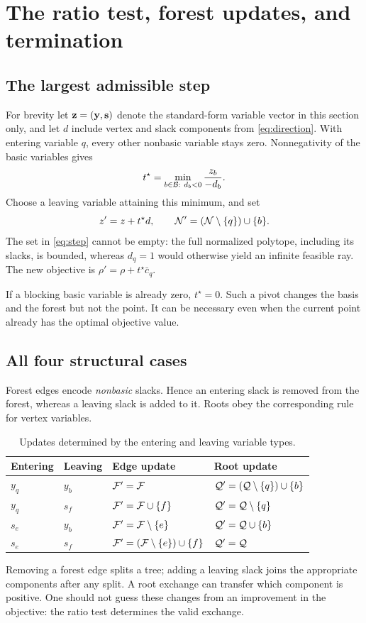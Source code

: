 \section{The ratio test, forest updates, and termination}\label{sec:pivots}

\subsection{The largest admissible step}
For brevity let $\mathbf{z}=(\mathbf{y},\mathbf{s})$ denote the standard-form variable vector in this
section only, and let $d$ include vertex and slack components from
\eqref{eq:direction}. With entering variable $q$, every other nonbasic
variable stays zero. Nonnegativity of the basic variables gives
\begin{equation}\label{eq:step}
 t^\star=\min_{b\in\mathcal B:\ d_b<0}\frac{z_b}{-d_b}.
\end{equation}
Choose a leaving variable attaining this minimum, and set
\begin{equation}\label{eq:pivot}
 z'=z+t^\star d,\qquad
 \mathcal N'=(\mathcal N\setminus\{q\})\cup\{b\}.
\end{equation}
The set in \eqref{eq:step} cannot be empty: the full normalized polytope,
including its slacks, is bounded, whereas $d_q=1$ would otherwise yield
an infinite feasible ray. The new objective is
$\rho'=\rho+t^\star\bar c_q$.

If a blocking basic variable is already zero, $t^\star=0$. Such a pivot
changes the basis and the forest but not the point. It can be necessary
even when the current point already has the optimal objective value.

\subsection{All four structural cases}
Forest edges encode \emph{nonbasic} slacks. Hence an entering slack is
removed from the forest, whereas a leaving slack is added to it. Roots
obey the corresponding rule for vertex variables.
\begin{table}[htbp]
\centering\small
\begin{tabular}{llll}
\toprule
Entering & Leaving & Edge update & Root update\\
\midrule
$y_q$ & $y_b$ & $\mathcal F' =\mathcal F$ & $\mathcal Q'=(\mathcal Q\setminus\{q\})\cup\{b\}$\\
$y_q$ & $s_f$ & $\mathcal F'=\mathcal F\cup\{f\}$ & $\mathcal Q'=\mathcal Q\setminus\{q\}$\\
$s_e$ & $y_b$ & $\mathcal F'=\mathcal F\setminus\{e\}$ & $\mathcal Q'=\mathcal Q\cup\{b\}$\\
$s_e$ & $s_f$ & $\mathcal F'=(\mathcal F\setminus\{e\})\cup\{f\}$ & $\mathcal Q'=\mathcal Q$\\
\bottomrule
\end{tabular}
\caption{Updates determined by the entering and leaving variable types.}
\label{tab:updates}
\end{table}
Removing a forest edge splits a tree; adding a leaving slack joins the
appropriate components after any split. A root exchange can transfer
which component is positive. One should not guess these changes from an
improvement in the objective: the ratio test determines the valid exchange.

